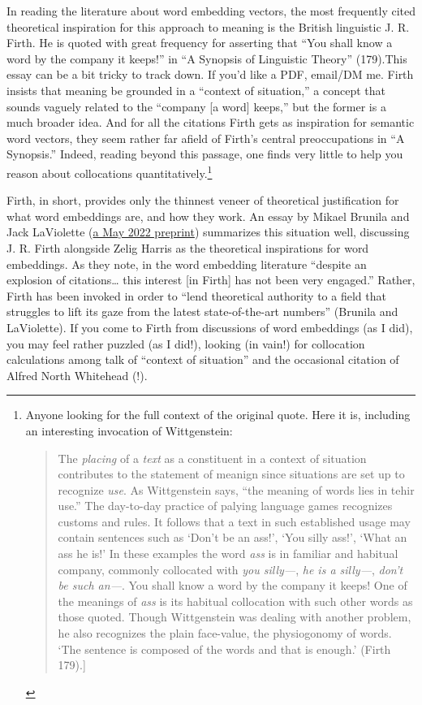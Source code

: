 \documentclass[
  12pt,
]{article}
\begin{document}
In reading the literature about word embedding vectors, the most
frequently cited theoretical inspiration for this approach to meaning is
the British linguistic J. R. Firth. He is quoted with great frequency
for asserting that ``You shall know a word by the company it keeps!'' in
``A Synopsis of Linguistic Theory'' (179).{This essay can be a bit
tricky to track down. If you'd like a PDF, email/DM me.} Firth insists
that meaning be grounded in a ``context of situation,'' a concept that
sounds vaguely related to the ``company {[}a word{]} keeps,'' but the
former is a much broader idea. And for all the citations Firth gets as
inspiration for semantic word vectors, they seem rather far afield of
Firth's central preoccupations in ``A Synopsis.'' Indeed, reading beyond
this passage, one finds very little to help you reason about
collocations quantitatively.\footnote{Anyone looking for the full
  context of the original quote. Here it is, including an interesting
  invocation of Wittgenstein:

  \begin{quote}
  The \emph{placing} of a \emph{text} as a constituent in a context of
  situation contributes to the statement of meanign since situations are
  set up to recognize \emph{use}. As Wittgenstein says, ``the meaning of
  words lies in tehir use.'' The day-to-day practice of palying language
  games recognizes customs and rules. It follows that a text in such
  established usage may contain sentences such as `Don't be an ass!',
  `You silly ass!', `What an ass he is!' In these examples the word
  \emph{ass} is in familiar and habitual company, commonly collocated
  with \emph{you silly---}, \emph{he is a silly---}, \emph{don't be such
  an---}. You shall know a word by the company it keeps! One of the
  meanings of \emph{ass} is its habitual collocation with such other
  words as those quoted. Though Wittgenstein was dealing with another
  problem, he also recognizes the plain face-value, the physiogonomy of
  words. `The sentence is composed of the words and that is enough.'
  (Firth 179).{]}
  \end{quote}}

Firth, in short, provides only the thinnest veneer of theoretical
justification for what word embeddings are, and how they work. An essay
by Mikael Brunila and Jack LaViolette
(\href{https://arxiv.org/abs/2205.07750}{a May 2022 preprint})
summarizes this situation well, discussing J. R. Firth alongside Zelig
Harris as the theoretical inspirations for word embeddings. As they
note, in the word embedding literature ``despite an explosion of
citations\ldots{} this interest {[}in Firth{]} has not been very
engaged.'' Rather, Firth has been invoked in order to ``lend theoretical
authority to a field that struggles to lift its gaze from the latest
state-of-the-art numbers'' (Brunila and LaViolette). If you come to
Firth from discussions of word embeddings (as I did), you may feel
rather puzzled (as I did!), looking (in vain!) for collocation
calculations among talk of ``context of situation'' and the occasional
citation of Alfred North Whitehead (!).
\end{document}
